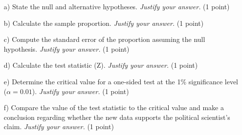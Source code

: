 \documentclass{article}
\begin{document}
\begin{enumerate}
\item[a)] State the null and alternative hypotheses. \emph{Justify your answer.} (1 point)
\begin{center}
\end{center}

\item[b)] Calculate the sample proportion. \emph{Justify your answer.} (1 point)
\begin{center}
\end{center}

\item[c)] Compute the standard error of the proportion assuming the null hypothesis. \emph{Justify your answer.} (1 point)
\begin{center}
\end{center}
    
\newpage
\item[d)] Calculate the test statistic (Z). \emph{Justify your answer.} (1 point)
\begin{center}
\end{center}

\item[e)] Determine the critical value for a one-sided test at the 1\% significance level ($\alpha=0.01$). \emph{Justify your answer.} (1 point)
\begin{center}
\end{center}

\item[f)] Compare the value of the test statistic to the critical value and make a conclusion regarding whether the new data supports the political scientist's claim. \emph{Justify your answer.} (1 point)
\begin{center}
\end{center}

\end{enumerate}
\end{document}
